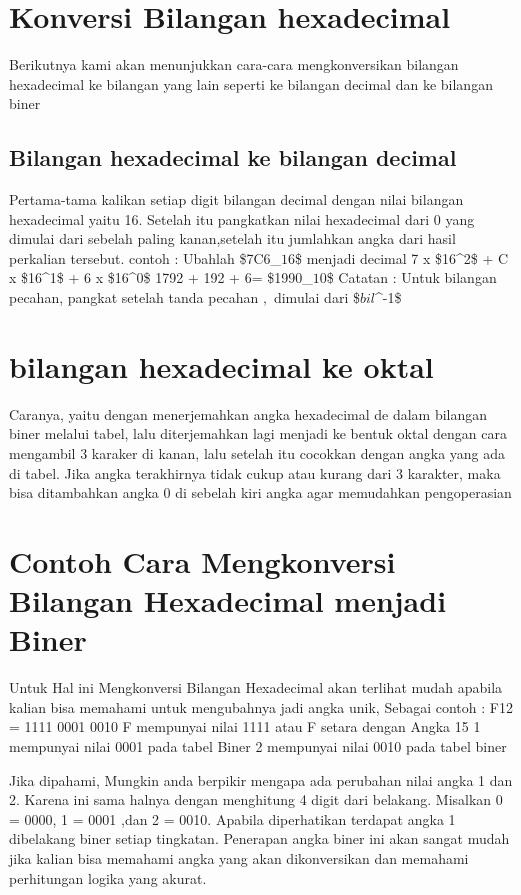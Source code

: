 \section{Konversi Bilangan hexadecimal}
Berikutnya kami akan menunjukkan cara-cara mengkonversikan bilangan hexadecimal ke bilangan yang lain seperti ke bilangan decimal dan ke bilangan biner
\subsection{Bilangan hexadecimal ke bilangan decimal}
Pertama-tama kalikan setiap digit bilangan decimal dengan nilai bilangan hexadecimal yaitu 16. Setelah itu pangkatkan nilai hexadecimal dari 0 yang dimulai dari sebelah paling kanan,setelah itu jumlahkan angka dari hasil perkalian tersebut.
contoh : 
Ubahlah \$7C6_\(16\)\$ menjadi decimal
		7 x \$16^2\$ + C x \$16^1\$ + 6 x \$16^0\$
		1792 + 192 + 6= \$1990_\(10\)\$
Catatan : Untuk bilangan pecahan, pangkat setelah tanda pecahan \(,\) dimulai dari \$\(bil\)^-1\$

\section{bilangan hexadecimal ke oktal}
Caranya, yaitu dengan menerjemahkan angka hexadecimal de dalam bilangan biner melalui tabel, lalu diterjemahkan lagi menjadi ke bentuk oktal dengan cara mengambil 3 karaker di kanan, lalu setelah itu cocokkan dengan angka yang ada di tabel. Jika angka terakhirnya tidak cukup atau kurang dari 3 karakter, maka bisa ditambahkan angka 0 di sebelah kiri angka agar memudahkan pengoperasian

\section{Contoh Cara Mengkonversi Bilangan Hexadecimal menjadi Biner}
 Untuk Hal ini Mengkonversi Bilangan Hexadecimal akan terlihat mudah apabila kalian bisa memahami untuk mengubahnya jadi angka unik, Sebagai contoh :
 F12 = 1111 0001 0010
 F mempunyai nilai 1111 atau F setara dengan Angka 15
 1 mempunyai nilai 0001 pada tabel Biner
 2 mempunyai nilai 0010 pada tabel biner
 
 Jika dipahami, Mungkin anda berpikir mengapa ada perubahan nilai angka 1 dan 2. Karena ini sama halnya dengan menghitung 4 digit dari belakang.
 Misalkan 0 = 0000, 1 = 0001 ,dan 2 = 0010. Apabila diperhatikan terdapat angka 1 dibelakang biner setiap tingkatan. Penerapan angka biner ini
 akan sangat mudah jika kalian bisa memahami angka yang akan dikonversikan dan memahami perhitungan logika yang akurat.
